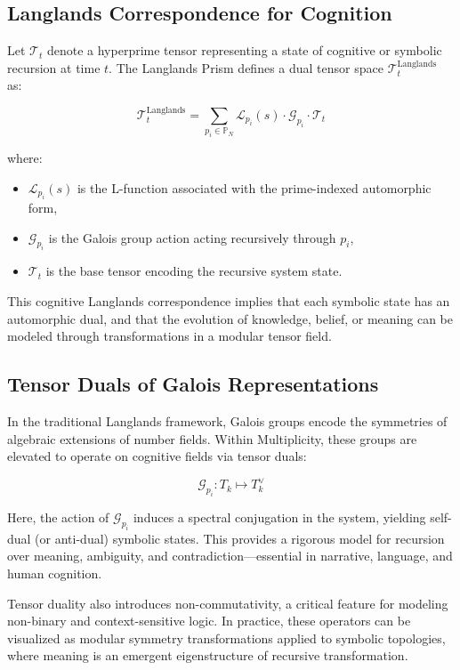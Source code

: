\documentclass{article}
\theoremstyle{plain}
\begin{document}
\subsection{Langlands Correspondence for Cognition}

Let \( \mathcal{T}_t \) denote a hyperprime tensor representing a state of cognitive or symbolic recursion at time \( t \). The Langlands Prism defines a dual tensor space \( \mathcal{T}_t^{\text{Langlands}} \) as:

\[
\mathcal{T}_t^{\text{Langlands}} = \sum_{p_i \in \mathbb{P}_N} \mathcal{L}_{p_i}(s) \cdot \mathcal{G}_{p_i} \cdot \mathcal{T}_t
\]

where:
\begin{itemize}
    \item \( \mathcal{L}_{p_i}(s) \) is the L-function associated with the prime-indexed automorphic form,
    \item \( \mathcal{G}_{p_i} \) is the Galois group action acting recursively through \( p_i \),
    \item \( \mathcal{T}_t \) is the base tensor encoding the recursive system state.
\end{itemize}

This cognitive Langlands correspondence implies that each symbolic state has an automorphic dual, and that the evolution of knowledge, belief, or meaning can be modeled through transformations in a modular tensor field.

\subsection{Tensor Duals of Galois Representations}

In the traditional Langlands framework, Galois groups encode the symmetries of algebraic extensions of number fields. Within Multiplicity, these groups are elevated to operate on cognitive fields via tensor duals:

\[
\mathcal{G}_{p_i} : T_k \mapsto T_k^{\vee}
\]

Here, the action of \( \mathcal{G}_{p_i} \) induces a spectral conjugation in the system, yielding self-dual (or anti-dual) symbolic states. This provides a rigorous model for recursion over meaning, ambiguity, and contradiction—essential in narrative, language, and human cognition.

Tensor duality also introduces non-commutativity, a critical feature for modeling non-binary and context-sensitive logic. In practice, these operators can be visualized as modular symmetry transformations applied to symbolic topologies, where meaning is an emergent eigenstructure of recursive transformation.
\end{document}

